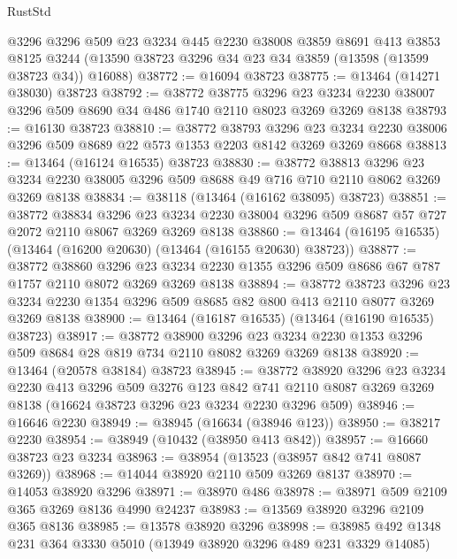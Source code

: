 \begin{lexlean}{RustStd}
\begin{coremodule}
    @3296
    @3296
    @509
    @23
    @3234
    @445
    @2230
    @38008
    @3859
    @8691
    @413
    @3853
    @8125
    @3244
    (@13590 @38723 @3296 @34 @23 @34 @3859 (@13598 (@13599 @38723 @34)) @16088)
@38772 := @16094 @38723
@38775 := @13464 (@14271 @38030) @38723
@38792 := @38772
    @38775
    @3296
    @23
    @3234
    @2230
    @38007
    @3296
    @509
    @8690
    @34
    @486
    @1740
    @2110
    @8023
    @3269
    @3269
    @8138
@38793 := @16130 @38723
@38810 := @38772
    @38793
    @3296
    @23
    @3234
    @2230
    @38006
    @3296
    @509
    @8689
    @22
    @573
    @1353
    @2203
    @8142
    @3269
    @3269
    @8668
@38813 := @13464 (@16124 @16535) @38723
@38830 := @38772
    @38813
    @3296
    @23
    @3234
    @2230
    @38005
    @3296
    @509
    @8688
    @49
    @716
    @710
    @2110
    @8062
    @3269
    @3269
    @8138
@38834 := @38118 (@13464 (@16162 @38095) @38723)
@38851 := @38772
    @38834
    @3296
    @23
    @3234
    @2230
    @38004
    @3296
    @509
    @8687
    @57
    @727
    @2072
    @2110
    @8067
    @3269
    @3269
    @8138
@38860 := @13464 (@16195 @16535) (@13464 (@16200 @20630) (@13464 (@16155 @20630) @38723))
@38877 := @38772
    @38860
    @3296
    @23
    @3234
    @2230
    @1355
    @3296
    @509
    @8686
    @67
    @787
    @1757
    @2110
    @8072
    @3269
    @3269
    @8138
@38894 := @38772
    @38723
    @3296
    @23
    @3234
    @2230
    @1354
    @3296
    @509
    @8685
    @82
    @800
    @413
    @2110
    @8077
    @3269
    @3269
    @8138
@38900 := @13464 (@16187 @16535) (@13464 (@16190 @16535) @38723)
@38917 := @38772
    @38900
    @3296
    @23
    @3234
    @2230
    @1353
    @3296
    @509
    @8684
    @28
    @819
    @734
    @2110
    @8082
    @3269
    @3269
    @8138
@38920 := @13464 (@20578 @38184) @38723
@38945 := @38772
    @38920
    @3296
    @23
    @3234
    @2230
    @413
    @3296
    @509
    @3276
    @123
    @842
    @741
    @2110
    @8087
    @3269
    @3269
    @8138
    (@16624 @38723 @3296 @23 @3234 @2230 @3296 @509)
@38946 := @16646 @2230
@38949 := @38945 (@16634 (@38946 @123))
@38950 := @38217 @2230
@38954 := @38949 (@10432 (@38950 @413 @842))
@38957 := @16660 @38723 @23 @3234
@38963 := @38954 (@13523 (@38957 @842 @741 @8087 @3269))
@38968 := @14044 @38920 @2110 @509 @3269 @8137
@38970 := @14053 @38920 @3296
@38971 := @38970 @486
@38978 := @38971 @509 @2109 @365 @3269 @8136 @4990 @24237
@38983 := @13569 @38920 @3296 @2109 @365 @8136
@38985 := @13578 @38920 @3296
@38998 := @38985 @492 @1348 @231 @364 @3330 @5010 (@13949 @38920 @3296 @489 @231 @3329 @14085)

\end{coremodule}
\end{lexlean}
